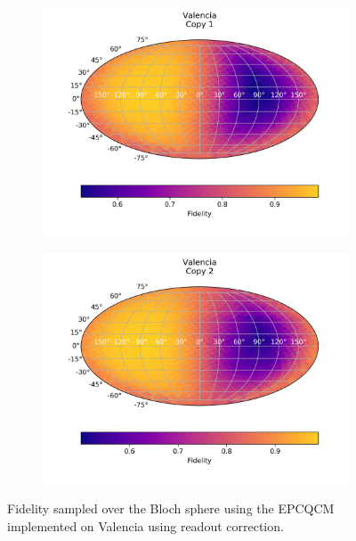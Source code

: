   \begin{figure}[H]
    \centering
    \begin{subfigure}{.5\textwidth}
      \centering
      \includegraphics[width=\textwidth]{Figures/Economical/IBM/FullSphere/results_valencia_copy1.png}
      \label{fig:epc_uncorrected_valencia_sphere_1}
    \end{subfigure}%
    \begin{subfigure}{.5\textwidth}
      \centering
      \includegraphics[width=\textwidth]{Figures/Economical/IBM/FullSphere/results_valencia_copy2.png}
      \label{fig:epc_uncorrected_valencia_sphere_2}
    \end{subfigure}
    \caption{Fidelity sampled over the Bloch sphere using the EPCQCM implemented on Valencia using readout correction.}
    \label{fig:epc_uncorrected_valencia_sphere}
  \end{figure}
  
